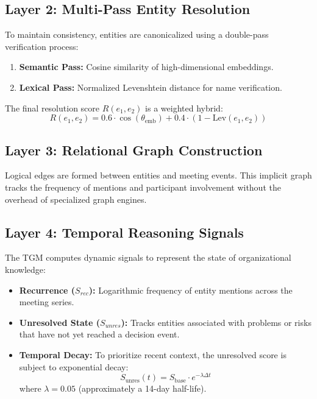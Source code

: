 \subsection{Layer 2: Multi-Pass Entity Resolution}
To maintain consistency, entities are canonicalized using a double-pass verification process:
\begin{enumerate}
    \item \textbf{Semantic Pass:} Cosine similarity of high-dimensional embeddings.
    \item \textbf{Lexical Pass:} Normalized Levenshtein distance for name verification.
\end{enumerate}
The final resolution score $R(e_1, e_2)$ is a weighted hybrid:
\begin{equation}
R(e_1, e_2) = 0.6 \cdot \cos(\theta_{\text{emb}}) + 0.4 \cdot (1 - \text{Lev}(e_1, e_2))
\end{equation}

\subsection{Layer 3: Relational Graph Construction}
Logical edges are formed between entities and meeting events. This implicit graph tracks the frequency of mentions and participant involvement without the overhead of specialized graph engines.

\subsection{Layer 4: Temporal Reasoning Signals}
The TGM computes dynamic signals to represent the state of organizational knowledge:
\begin{itemize}
    \item \textbf{Recurrence ($S_{rec}$):} Logarithmic frequency of entity mentions across the meeting series.
    \item \textbf{Unresolved State ($S_{unres}$):} Tracks entities associated with problems or risks that have not yet reached a decision event.
    \item \textbf{Temporal Decay:} To prioritize recent context, the unresolved score is subject to exponential decay:
    \begin{equation}
    S_{\text{unres}}(t) = S_{\text{base}} \cdot e^{-\lambda \Delta t}
    \end{equation}
    where $\lambda = 0.05$ (approximately a 14-day half-life).
\end{itemize}


